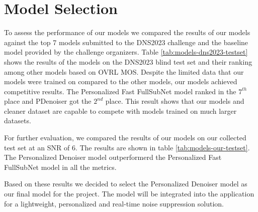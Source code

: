 \section{Model Selection}

To assess the performance of our models we compared the results of our models against the top 7 models submitted to the DNS2023 challenge and the baseline model provided by the challenge organizers.
Table \ref{tab:models-dns2023-testset} shows the results of the models on the DNS2023 blind test set and their ranking among other models based on OVRL MOS.
Despite the limited data that our models were trained on compared to the other models, our models achieved competitive results.
The Personalized Fast FullSubNet model ranked in the $7^{th}$ place and PDenoiser got the $2^{nd}$ place. This result shows that our models and cleaner dataset are capable to compete with models trained on much larger datasets.

For further evaluation, we compared the results of our models on our collected test set at an SNR of 6. The results are shown in table \ref{tab:models-our-testset}.
The Personalized Denoiser model outperformerd the Personalized Fast FullSubNet model in all the metrics.

Based on these results we decided to select the Personalized Denoiser model as our final model for the project. The model will be integrated into the application for a lightweight, personalized and real-time noise suppression solution.

